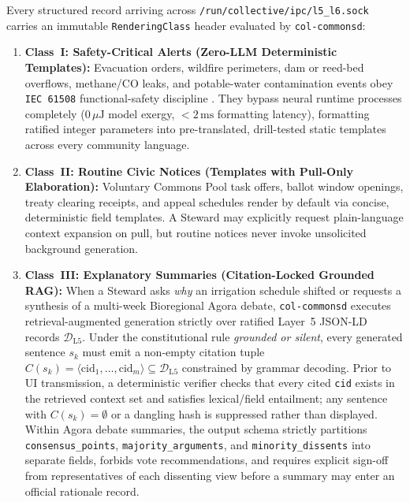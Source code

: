 Every structured record arriving across \texttt{/run/collective/ipc/l5\_l6.sock} carries an immutable \texttt{RenderingClass} header evaluated by \texttt{col-commonsd}:
\begin{enumerate}
  \item \textbf{Class~I: Safety-Critical Alerts (Zero-LLM Deterministic Templates):} Evacuation orders, wildfire perimeters, dam or reed-bed overflows, methane/CO leaks, and potable-water contamination events obey \texttt{IEC 61508} functional-safety discipline \parencite{iec61508}. They bypass neural runtime processes completely ($0\,\mu\mathrm{J}$ model exergy, $< 2\,\mathrm{ms}$ formatting latency), formatting ratified integer parameters into pre-translated, drill-tested static templates across every community language.
  \item \textbf{Class~II: Routine Civic Notices (Templates with Pull-Only Elaboration):} Voluntary Commons Pool task offers, ballot window openings, treaty clearing receipts, and appeal schedules render by default via concise, deterministic field templates. A Steward may explicitly request plain-language context expansion on pull, but routine notices never invoke unsolicited background generation.
  \item \textbf{Class~III: Explanatory Summaries (Citation-Locked Grounded RAG):} When a Steward asks \emph{why} an irrigation schedule shifted or requests a synthesis of a multi-week Bioregional Agora debate, \texttt{col-commonsd} executes retrieval-augmented generation \parencite{lewis2020rag} strictly over ratified Layer~5 JSON-LD records $\mathcal{D}_{\mathrm{L5}}$. Under the constitutional rule \emph{grounded or silent}, every generated sentence $s_k$ must emit a non-empty citation tuple $C(s_k) = \langle \mathrm{cid}_1, \dots, \mathrm{cid}_m \rangle \subseteq \mathcal{D}_{\mathrm{L5}}$ constrained by grammar decoding. Prior to UI transmission, a deterministic verifier checks that every cited \texttt{cid} exists in the retrieved context set and satisfies lexical/field entailment; any sentence with $C(s_k) = \emptyset$ or a dangling hash is suppressed rather than displayed. Within Agora debate summaries, the output schema strictly partitions \texttt{consensus\_points}, \texttt{majority\_arguments}, and \texttt{minority\_dissents} into separate fields, forbids vote recommendations, and requires explicit sign-off from representatives of each dissenting view before a summary may enter an official rationale record.
\end{enumerate}

